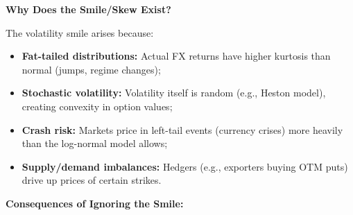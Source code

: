 \textbf{Why Does the Smile/Skew Exist?}

The volatility smile arises because:
\begin{itemize}
	\item \textbf{Fat-tailed distributions:} Actual FX returns have higher kurtosis than normal (jumps, regime changes);
	\item \textbf{Stochastic volatility:} Volatility itself is random (e.g., Heston model), creating convexity in option values;
	\item \textbf{Crash risk:} Markets price in left-tail events (currency crises) more heavily than the log-normal model allows;
	\item \textbf{Supply/demand imbalances:} Hedgers (e.g., exporters buying OTM puts) drive up prices of certain strikes.
\end{itemize}

\textbf{Consequences of Ignoring the Smile:}

